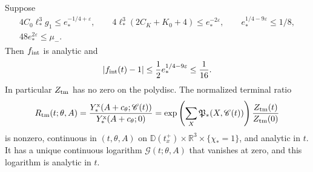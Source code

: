 \documentclass[11pt,letterpaper,reqno]{amsart}
\newcommand{\R}{\mathbb R}
\begin{document}
\begin{proposition}\label{prop:interacting-factor}
Suppose
\begin{gather}
 4C_0\ell_*^3g_1\le e_*^{-1/4+\varepsilon},\qquad
 4\ell_*^3(2C_K+K_0+4)\le e_*^{-2\varepsilon},\qquad
 e_*^{1/4-9\varepsilon}\le1/8,
                                      \label{eq:interacting-factor-conditions}\\
 48e_*^{2\varepsilon}\le\mu_- .
                                      \label{eq:interacting-small-complex-mass}
\end{gather}
Then $f_{\rm int}$ is analytic and
\begin{equation}\label{eq:interacting-factor-bound}
 |f_{\rm int}(t)-1|\le\frac12e_*^{1/4-9\varepsilon}
                              \le\frac1{16}.
\end{equation}
In particular $Z_{\rm tm}$ has no zero on the
polydisc. The normalized terminal ratio
\begin{equation}\label{eq:interacting-terminal-ratio}
 R_{\rm tm}(t;\theta,A)=
 \frac{Y_*^{\rm x}(A+c_\theta;\mathscr C(t))}
      {Y_*^{\rm x}(A+c_\theta;0)}
 =\exp\left(\sum_X\mathfrak P_*(X,\mathscr C(t))\right)
       \frac{Z_{\rm tm}(t)}{Z_{\rm tm}(0)}
\end{equation}
is nonzero, continuous in $(t,\theta,A)$ on
$\mathbb D(t_x^+)\times\R^3\times\{\chi_*=1\}$,
and analytic in $t$. It has a unique continuous
logarithm $\mathcal G(t;\theta,A)$ that vanishes
at zero, and this logarithm is analytic in $t$.
\end{proposition}
\end{document}
